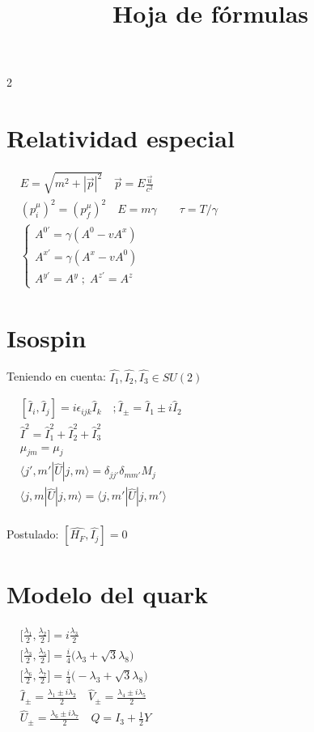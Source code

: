 \documentclass[a4, 12pt]{article}
\title{Hoja de fórmulas}
\author{}
\date{}
\begin{document}
\begin{multicols}{2}
    \section*{Relatividad especial}

    $
    \begin{aligned}
        &E = \sqrt{m^{2} + |\vec{p}|^2} \quad
        \vec{p} = E \frac{\vec{u}}{c^2} \\
        &(p_{i}^{\mu})^2 = (p_{f}^{\mu})^2 \quad
        E = m\gamma \quad \quad
        \tau = T/\gamma \\
        &\begin{cases}
            A^{0'} = \gamma (A^0 - vA^x) \\
            A^{x'} = \gamma (A^x - vA^0) \\
            A^{y'} = A^y \; ; \; A^{z'} = A^z
        \end{cases}
    \end{aligned}
    $
    
    \section*{Isospin}
    Teniendo en cuenta: $\hat{I_1}, \hat{I_2}, \hat{I_3} \in SU(2)$

    $
    \begin{aligned}
        &[\hat{I}_i, \hat{I}_j] = i \epsilon_{ijk}\hat{I}_k \quad
        ; \hat{I}_{\pm} = \hat{I}_1 \pm i\hat{I}_2 \\
        &\hat{I}^2 = \hat{I}_1^2 + \hat{I}_2^2 + \hat{I}_3^2 \\
        &\mu_{jm} = \mu_j \\
        &\langle j', m'|\hat{U}|j,m \rangle = \delta_{jj'} \delta_{mm'}M_j \\
        &\langle j, m|\hat{U}|j,m \rangle = \langle j, m'|\hat{U}|j,m' \rangle \\
    \end{aligned}$

    \noindent Postulado: $[\hat{H_F}, \hat{I_j}] = 0$

    \section*{Modelo del quark}
    $
    \begin{aligned}
        &\bigg[\frac{\lambda_1}{2}, \frac{\lambda_2}{2}\bigg] = i \frac{\lambda_3}{2} \\
        &\bigg[\frac{\lambda_3}{2}, \frac{\lambda_5}{2}\bigg] = \frac{i}{4}\big(\lambda_3 + \sqrt{3}\lambda_8\big) \\
        &\bigg[\frac{\lambda_6}{2}, \frac{\lambda_7}{2}\bigg] = \frac{i}{4}\big(-\lambda_3 + \sqrt{3}\lambda_8\big) \\
        &\hat{I}_{\pm} = \frac{\lambda_1 \pm i\lambda_2}{2} \quad
        \hat{V}_{\pm} = \frac{\lambda_4 \pm i\lambda_5}{2} \\
        &\hat{U}_{\pm} = \frac{\lambda_6 \pm i\lambda_7}{2} \quad
        Q = I_3 + \frac{1}{2}Y
    \end{aligned}
    $


\end{multicols}
\end{document}
